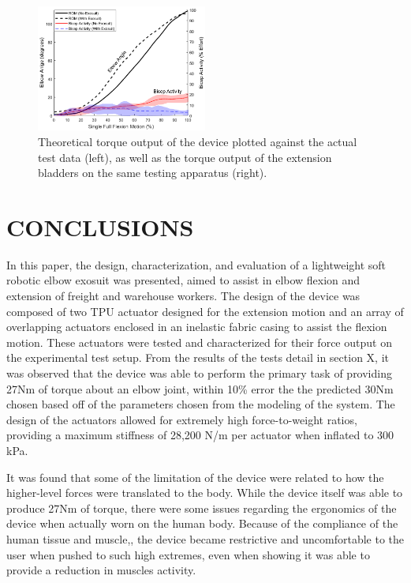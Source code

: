 \documentclass[letterpaper, 10 pt, conference]{ieeeconf}  %
\begin{document}
\begin{figure}
\centering
\includegraphics[width=0.5\textwidth]{ROM.PNG}
\caption{Theoretical torque output of the device plotted against the actual test data (left), as well as the torque output of the extension bladders on the same testing apparatus (right).}
\label{fig:stifftest}
\end{figure}

\section{CONCLUSIONS}

In this paper, the design, characterization, and evaluation of a lightweight soft robotic elbow exosuit was presented, aimed to assist in elbow flexion and extension of freight and warehouse workers. The design of the device was composed of two TPU actuator designed for the extension motion and an array of overlapping actuators enclosed in an inelastic fabric casing to assist the flexion motion. These actuators were tested and characterized for their force output on the experimental test setup.  From the results of the tests detail in section X, it was observed that the device was able to perform the primary task of providing 27Nm of torque about an elbow joint, within 10\% error the the predicted 30Nm chosen based off of the parameters chosen from the modeling of the system.  The design of the actuators allowed for extremely high force-to-weight ratios, providing a maximum stiffness of 28,200 N/m per actuator when inflated to 300 kPa.  

	It was found that some of the limitation of the device were related to how the higher-level forces were translated to the body.  While the device itself was able to produce 27Nm of torque, there were some issues regarding the ergonomics of the device when actually worn on the human body.  Because of the compliance of the human tissue and muscle,, the device became restrictive and uncomfortable  to the user when pushed to such high extremes, even when showing it was able to provide a reduction in muscles activity.  
\end{document}
